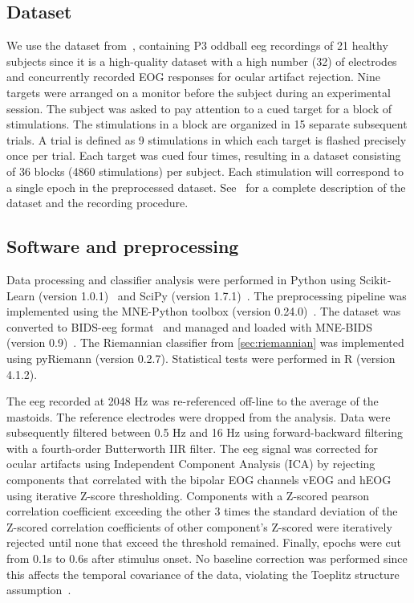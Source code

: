 	\subsection{Dataset}
	We use the dataset from~\textcite{Wittevrongel2016}, containing P3 oddball \ac{eeg}
	recordings of 21 healthy subjects since it is a high-quality dataset with a high
	number (32) of electrodes and concurrently recorded EOG responses for ocular artifact rejection.
	Nine targets were arranged on a monitor before the subject during an
	experimental session.
	The subject was asked to pay attention to a cued target for a block
	of stimulations.
	The stimulations in a block are organized in 15 separate subsequent trials.
	A trial is defined as 9 stimulations in which each target is flashed
	precisely once per trial.
	Each target was cued four times, resulting in a dataset consisting of 36 blocks
	(4860 stimulations) per subject.
	Each stimulation will correspond to a single epoch in the preprocessed dataset.
	See~\textcite{Wittevrongel2016} for a complete description of the dataset and the recording procedure.

	\subsection{Software and preprocessing}
	Data processing and classifier analysis were performed in Python using
	Scikit-Learn (version 1.0.1)~\cite{Pedregosa2011} and SciPy (version
	1.7.1)~\cite{Virtanen2020}.
	The preprocessing pipeline was implemented using the MNE-Python toolbox
	(version 0.24.0)~\cite{Gramfort2013}.
	The dataset was converted to BIDS-\ac{eeg} format~\cite{Pernet2019} and managed and
	loaded with MNE-BIDS (version 0.9)~\cite{Appelhoff2019}.
	The Riemannian classifier from \cref{sec:riemannian} was implemented using
	pyRiemann (version 0.2.7).
	Statistical tests were performed in R (version 4.1.2).

	The \ac{eeg} recorded at 2048 Hz was re-referenced off-line to the average of the mastoids.
	The reference electrodes were dropped from the analysis.
	Data were subsequently filtered between 0.5 Hz and 16 Hz using forward-backward
	filtering with a fourth-order Butterworth IIR filter.
	The \ac{eeg} signal was corrected for ocular artifacts using Independent Component
	Analysis (ICA) by rejecting components that correlated with the bipolar EOG
  channels vEOG and hEOG using iterative Z-score thresholding.
  Components with a Z-scored pearson correlation coefficient
  exceeding the other 3 times the standard deviation of the Z-scored
  correlation coefficients of other component's Z-scored were iteratively
  rejected until none that exceed the threshold remained.
  Finally, epochs were cut from 0.1s to 0.6s after stimulus onset.
	No baseline correction was performed since this affects the temporal covariance
	of the data, violating the Toeplitz structure assumption~\cite{Bijma2003}.

